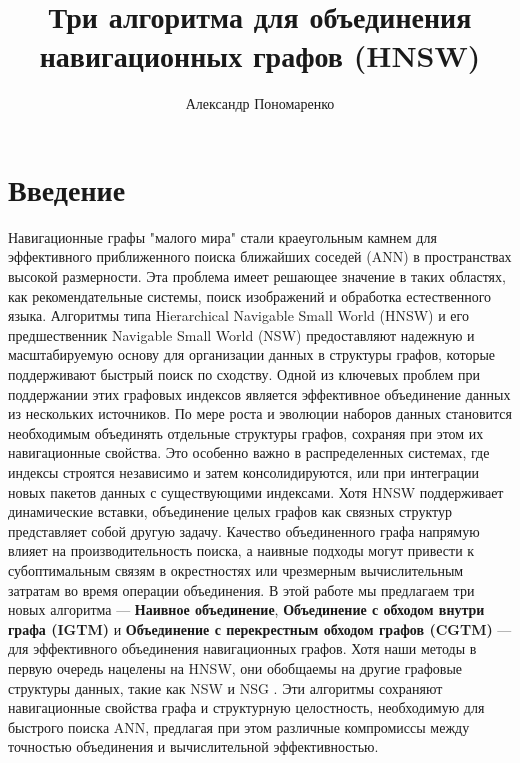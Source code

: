 \documentclass{article}
\title{Три алгоритма для объединения навигационных графов (HNSW)}
\author[1]{Александр Пономаренко}
\date{}
\affil[1]{НИУ ВШЭ}
\begin{document}
\maketitle
\section{Введение}
Навигационные графы "малого мира" стали краеугольным камнем для эффективного приближенного поиска ближайших соседей (ANN) в пространствах высокой размерности. Эта проблема имеет решающее значение в таких областях, как рекомендательные системы, поиск изображений и обработка естественного языка. Алгоритмы типа Hierarchical Navigable Small World (HNSW) \cite{hnsw} и его предшественник Navigable Small World (NSW) \cite{nsw2011,nsw2012,nsw2014} предоставляют надежную и масштабируемую основу для организации данных в структуры графов, которые поддерживают быстрый поиск по сходству.
Одной из ключевых проблем при поддержании этих графовых индексов является эффективное объединение данных из нескольких источников. По мере роста и эволюции наборов данных становится необходимым объединять отдельные структуры графов, сохраняя при этом их навигационные свойства. Это особенно важно в распределенных системах, где индексы строятся независимо и затем консолидируются, или при интеграции новых пакетов данных с существующими индексами.
Хотя HNSW поддерживает динамические вставки, объединение целых графов как связных структур представляет собой другую задачу. Качество объединенного графа напрямую влияет на производительность поиска, а наивные подходы могут привести к субоптимальным связям в окрестностях или чрезмерным вычислительным затратам во время операции объединения.
В этой работе мы предлагаем три новых алгоритма — \textbf{Наивное объединение}, \textbf{Объединение с обходом внутри графа (IGTM)} и \textbf{Объединение с перекрестным обходом графов (CGTM)} — для эффективного объединения навигационных графов. Хотя наши методы в первую очередь нацелены на HNSW, они обобщаемы на другие графовые структуры данных, такие как NSW \cite{nsw2011} и NSG \cite{NSG}. Эти алгоритмы сохраняют навигационные свойства графа и структурную целостность, необходимую для быстрого поиска ANN, предлагая при этом различные компромиссы между точностью объединения и вычислительной эффективностью.
\end{document}

